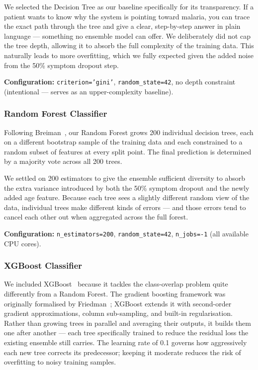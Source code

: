 \documentclass[12pt,a4paper]{article}
\begin{document}
We selected the Decision Tree as our baseline specifically for its transparency. If a patient wants to know why the system is pointing toward malaria, you can trace the exact path through the tree and give a clear, step-by-step answer in plain language --- something no ensemble model can offer. We deliberately did not cap the tree depth, allowing it to absorb the full complexity of the training data. This naturally leads to more overfitting, which we fully expected given the added noise from the 50\% symptom dropout step.

\textbf{Configuration:} \texttt{criterion='gini'}, \texttt{random\_state=42}, no depth constraint (intentional --- serves as an upper-complexity baseline).

\subsubsection{Random Forest Classifier}
Following Breiman~\cite{breiman2001}, our Random Forest grows 200 individual decision trees, each on a different bootstrap sample of the training data and each constrained to a random subset of features at every split point. The final prediction is determined by a majority vote across all 200 trees.

We settled on 200 estimators to give the ensemble sufficient diversity to absorb the extra variance introduced by both the 50\% symptom dropout and the newly added age feature. Because each tree sees a slightly different random view of the data, individual trees make different kinds of errors --- and those errors tend to cancel each other out when aggregated across the full forest.

\textbf{Configuration:} \texttt{n\_estimators=200}, \texttt{random\_state=42}, \texttt{n\_jobs=-1} (all available CPU cores).

\subsubsection{XGBoost Classifier}
We included XGBoost~\cite{chen2016xgboost} because it tackles the class-overlap problem quite differently from a Random Forest. The gradient boosting framework was originally formalised by Friedman~\cite{friedman2001}; XGBoost extends it with second-order gradient approximations, column sub-sampling, and built-in regularisation. Rather than growing trees in parallel and averaging their outputs, it builds them one after another --- each tree specifically trained to reduce the residual loss the existing ensemble still carries. The learning rate of 0.1 governs how aggressively each new tree corrects its predecessor; keeping it moderate reduces the risk of overfitting to noisy training samples.
\end{document}
